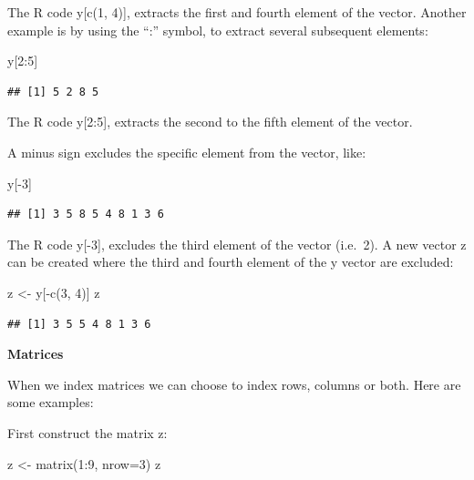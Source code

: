 \documentclass[
]{book}
\newenvironment{Shaded}{\begin{snugshade}}{\end{snugshade}}
\newcommand{\AttributeTok}[1]{\textcolor[rgb]{0.77,0.63,0.00}{#1}}
\newcommand{\DecValTok}[1]{\textcolor[rgb]{0.00,0.00,0.81}{#1}}
\newcommand{\FunctionTok}[1]{\textcolor[rgb]{0.00,0.00,0.00}{#1}}
\newcommand{\NormalTok}[1]{#1}
\newcommand{\OtherTok}[1]{\textcolor[rgb]{0.56,0.35,0.01}{#1}}
\newcommand{\SpecialCharTok}[1]{\textcolor[rgb]{0.00,0.00,0.00}{#1}}
\begin{document}
The R code y{[}c(1, 4){]}, extracts the first and fourth element of the vector. Another example is by using the ``:'' symbol, to extract several subsequent elements:

\begin{Shaded}
\begin{Highlighting}[]
\NormalTok{y[}\DecValTok{2}\SpecialCharTok{:}\DecValTok{5}\NormalTok{]}
\end{Highlighting}
\end{Shaded}

\begin{verbatim}
## [1] 5 2 8 5
\end{verbatim}

The R code y{[}2:5{]}, extracts the second to the fifth element of the vector.

A minus sign excludes the specific element from the vector, like:

\begin{Shaded}
\begin{Highlighting}[]
\NormalTok{y[}\SpecialCharTok{{-}}\DecValTok{3}\NormalTok{]}
\end{Highlighting}
\end{Shaded}

\begin{verbatim}
## [1] 3 5 8 5 4 8 1 3 6
\end{verbatim}

The R code y{[}-3{]}, excludes the third element of the vector (i.e.~2).
A new vector z can be created where the third and fourth element of the y vector are excluded:

\begin{Shaded}
\begin{Highlighting}[]
\NormalTok{z }\OtherTok{\textless{}{-}}\NormalTok{ y[}\SpecialCharTok{{-}}\FunctionTok{c}\NormalTok{(}\DecValTok{3}\NormalTok{, }\DecValTok{4}\NormalTok{)]}
\NormalTok{z}
\end{Highlighting}
\end{Shaded}

\begin{verbatim}
## [1] 3 5 5 4 8 1 3 6
\end{verbatim}

\textbf{Matrices}

When we index matrices we can choose to index rows, columns or both. Here are some examples:

First construct the matrix z:

\begin{Shaded}
\begin{Highlighting}[]
\NormalTok{z }\OtherTok{\textless{}{-}} \FunctionTok{matrix}\NormalTok{(}\DecValTok{1}\SpecialCharTok{:}\DecValTok{9}\NormalTok{, }\AttributeTok{nrow=}\DecValTok{3}\NormalTok{)}
\NormalTok{z}
\end{Highlighting}
\end{Shaded}
\end{document}

